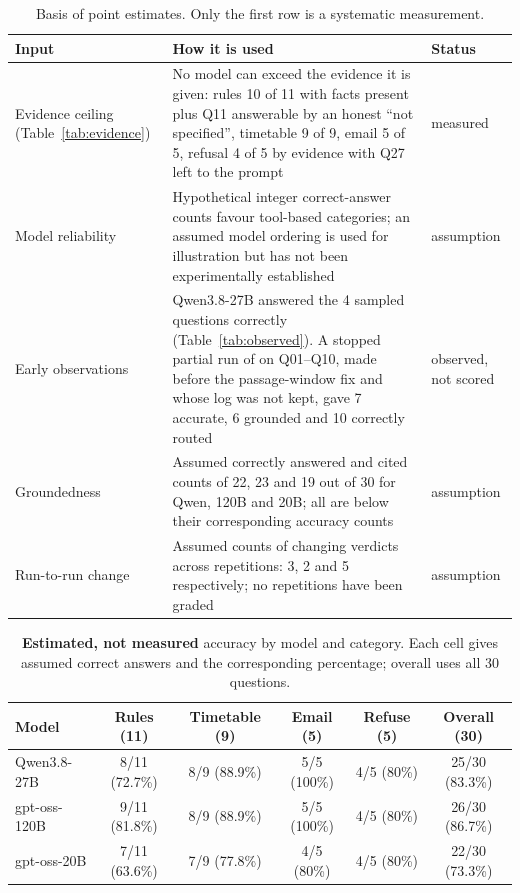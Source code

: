 \documentclass[10pt,a4paper]{article}
\newcommand{\code}[1]{\texttt{\detokenize{#1}}}
\begin{document}
\begin{table}[H]
\centering\small
\caption{Basis of point estimates. Only the first row is a systematic measurement.}\label{tab:basis}
\begin{tabularx}{\textwidth}{@{}l Y l@{}}
\toprule
\textbf{Input} & \textbf{How it is used} & \textbf{Status}\\
\midrule
Evidence ceiling (Table~\ref{tab:evidence}) & No model can exceed the evidence it is given: rules 10 of 11 with facts present plus Q11 answerable by an honest ``not specified'', timetable 9 of 9, email 5 of 5, refusal 4 of 5 by evidence with Q27 left to the prompt & measured\\
Model reliability & Hypothetical integer correct-answer counts favour tool-based categories; an assumed model ordering is used for illustration but has not been experimentally established & assumption\\
Early observations & Qwen3.8-27B answered the 4 sampled questions correctly (Table~\ref{tab:observed}). A stopped partial run of \code{gpt-oss-20b} on Q01--Q10, made before the passage-window fix and whose log was not kept, gave 7 accurate, 6 grounded and 10 correctly routed & observed, not scored\\
Groundedness & Assumed correctly answered and cited counts of 22, 23 and 19 out of 30 for Qwen, 120B and 20B; all are below their corresponding accuracy counts & assumption\\
Run-to-run change & Assumed counts of changing verdicts across repetitions: 3, 2 and 5 respectively; no repetitions have been graded & assumption\\
\bottomrule
\end{tabularx}
\end{table}

\begin{table}[H]
\centering\small
\caption{\textbf{Estimated, not measured} accuracy by model and category. Each cell gives assumed correct answers and the corresponding percentage; overall uses all 30 questions.}\label{tab:matrix}
\scriptsize
\begin{tabular}{@{}lccccc@{}}
\toprule
\textbf{Model} & \textbf{Rules (11)} & \textbf{Timetable (9)} & \textbf{Email (5)} & \textbf{Refuse (5)} & \textbf{Overall (30)}\\
\midrule
Qwen3.8-27B & \cellcolor{orange!30}8/11 (72.7\%) & \cellcolor{yellow!35}8/9 (88.9\%) & \cellcolor{green!25}5/5 (100\%) & \cellcolor{yellow!35}4/5 (80\%) & \cellcolor{yellow!35}25/30 (83.3\%)\\
gpt-oss-120B & \cellcolor{yellow!35}9/11 (81.8\%) & \cellcolor{yellow!35}8/9 (88.9\%) & \cellcolor{green!25}5/5 (100\%) & \cellcolor{yellow!35}4/5 (80\%) & \cellcolor{yellow!35}26/30 (86.7\%)\\
gpt-oss-20B & \cellcolor{red!18}7/11 (63.6\%) & \cellcolor{orange!30}7/9 (77.8\%) & \cellcolor{yellow!35}4/5 (80\%) & \cellcolor{yellow!35}4/5 (80\%) & \cellcolor{orange!30}22/30 (73.3\%)\\
\bottomrule
\end{tabular}
\end{table}
\end{document}
